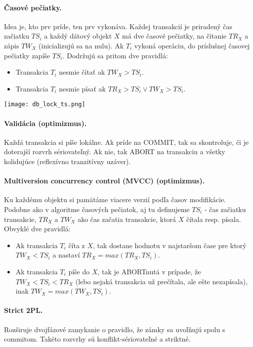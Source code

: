 \documentclass[10pt,a4paper]{article}
\begin{document}
\paragraph{Časové pečiatky.}
Idea je, kto prv príde, ten prv vykonáva. 
Každej transakcií je priradený čas začiatku $TS_i$ a každý dátový objekt $X$ má dve časové pečiatky, na čítanie $TR_X$ a zápis $TW_X$ (inicializujú sa na nulu). Ak $T_i$ vykoná operáciu, do príslušnej časovej pečiatky zapíše $TS_i$. Dodržujú sa pritom dve pravidlá: 
\begin{itemize}
\item Transakcia $T_i$ nesmie čítať ak $TW_X > TS_i$.
\item Transakcia $T_i$ nesmie písať ak $TR_X > TS_i \vee TW_X > TS_i$.
\end{itemize}

\begin{center}
\texttt{[image: db\_lock\_ts.png]}
\end{center}

\paragraph{Validácia (optimizmus).}
Každá transakcia si píše lokálne. Ak príde na COMMIT, tak sa skontroluje, či je doterajší rozvrh sériovateľný. Ak nie, tak ABORT na transakciu a všetky kolidujúce (reflexívno tranzitívny uzáver). 

\paragraph{Multiversion concurrency control (MVCC) (optimizmus).}
Ku každému objektu si pamätáme viacere verzií podľa časov modifikácie.
Podobne ako v algoritme časových pečiatok, aj tu definujeme $TS_i$ - čas začiatku transakcie, $TR_X$ a $TW_X$ ako čas začatia transakcie, ktorá $X$ čítala resp. písala. Obvyklé dve pravidlá: 

\begin{itemize}
\item Ak transakcia $T_i$ číta z $X$, tak dostane hodnotu v najstaršom čase pre ktorý $TW_X < TS_i$ a nastaví $TR_X = max(TR_X, TS_i)$.
\item Ak transakcia $T_i$ píše do $X$, tak je ABORTnutá v prípade, že $TW_X < TS_i < TR_X$ (lebo nejaká transakcia už prečítala, ale ešte nezapísala), inak $TW_X = max(TW_X, TS_i)$.
\end{itemize}

\paragraph{Strict 2PL.}
Rozširuje dvojfázové zamykanie o pravidlo, že zámky sa uvoľňujú spolu s commitom. Takéto rozvrhy sú konflikt-sériovateľné a striktné. 
\end{document}
